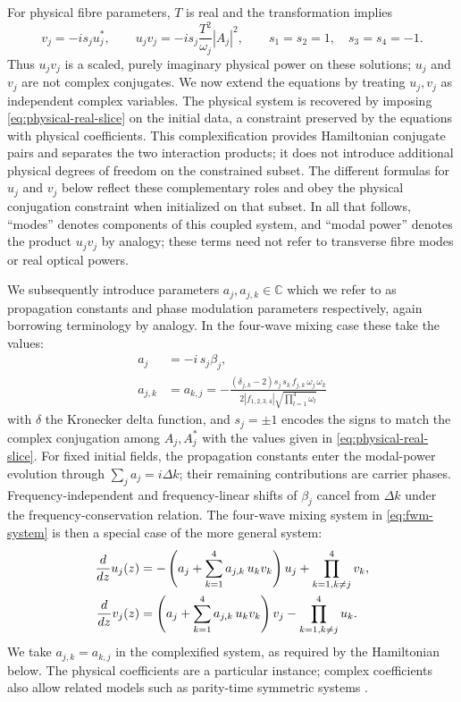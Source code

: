 \documentclass[11pt,a4paper]{article}
\numberwithin{equation}{section}
\begin{document}
For physical fibre parameters, $T$ is real and the transformation implies
\begin{equation}
v_j=-is_j u_j^*,\qquad
u_jv_j=-is_j\frac{T^2}{\omega_j}|A_j|^2,
\qquad s_1=s_2=1,\quad s_3=s_4=-1.
\label{eq:physical-real-slice}
\end{equation}
Thus $u_jv_j$ is a scaled, purely imaginary physical power on these solutions; $u_j$ and $v_j$ are not complex conjugates.
We now extend the equations by treating $u_j,v_j$ as independent complex variables.
The physical system is recovered by imposing \eqref{eq:physical-real-slice} on the initial data, a constraint preserved by the equations with physical coefficients.
This complexification provides Hamiltonian conjugate pairs and separates the two interaction products; it does not introduce additional physical degrees of freedom on the constrained subset.
The different formulas for $u_j$ and $v_j$ below reflect these complementary roles and obey the physical conjugation constraint when initialized on that subset.
In all that follows, ``modes'' denotes components of this coupled system, and ``modal power'' denotes the product $u_jv_j$ by analogy; these terms need not refer to transverse fibre modes or real optical powers.

We subsequently introduce parameters $a_j, a_{j,k} \in \mathbb{C}$ which we refer to as propagation constants and phase modulation parameters respectively, again borrowing terminology by analogy.
In the four-wave mixing case these take the values:
\begin{align}
{a}_{j} &= - i\, s_j {\beta}_{j}, \\
{a}_{j,k} &= {a}_{k,j} = - \frac{\left(\delta_{j, k} - 2\right) s_j\, s_k\, {f}_{j,k}\, {\omega}_{j}\, {\omega}_{k}}{2 \left|{{f}_{1,2,3,4}}\right| \sqrt{\prod_{l=1}^{4} {\omega}_{l}}}
\end{align}
with $\delta$ the Kronecker delta function, and $s_j=\pm1$ encodes the signs to match the complex conjugation among $A_j, A^*_j$ with the values given in \eqref{eq:physical-real-slice}.
For fixed initial fields, the propagation constants enter the modal-power evolution through $\sum_j a_j=i\Delta k$; their remaining contributions are carrier phases.
Frequency-independent and frequency-linear shifts of $\beta_j$ cancel from $\Delta k$ under the frequency-conservation relation.
The four-wave mixing system in \eqref{eq:fwm-system} is then a special case of the more general system:
\begin{align}
\frac{d}{d z} u_j{\left(z \right)} &= - \left({a}_{j} + \sum_{k=1}^{4} {a}_{j,k}\,u_k v_k \right) u_j + \prod\limits_{k=1, k \ne j}^{4} v_k, \notag \\
\frac{d}{d z} v_j{\left(z \right)} &= \left({a}_{j} + \sum_{k=1}^{4} {a}_{j,k}\,u_k v_k \right) v_j - \prod\limits_{k=1, k \ne j}^{4} u_k. \label{eq:uv-system}
\end{align}
We take $a_{j,k}=a_{k,j}$ in the complexified system, as required by the Hamiltonian below.
The physical coefficients are a particular instance; complex coefficients also allow related models such as parity-time symmetric systems \cite{heskethGeneralComplexEnvelope2015,sarmaContinuousDiscreteSchrodinger2014}.
\end{document}
